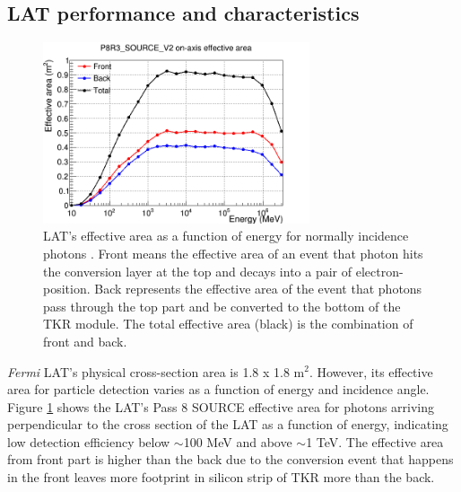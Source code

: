 \subsection{LAT performance and characteristics}

\begin{figure}[h!]
    \centering
    \includegraphics[width=0.7\textwidth]{content/background/figures/eff_energy.png}
    \caption{
        LAT's effective area as a function of energy
        for normally incidence photons \citep{lat_p8_performance}.
        Front means the effective area of an event that photon hits
        the conversion layer at the top and decays into
        a pair of electron-position.
        Back represents the effective area of the event that photons
        pass through the top part and be converted to the bottom of 
        the TKR module. The total effective area (black)
        is the combination of front and back.
    }
    \label{fig:eff_energy}
\end{figure}

\textit{Fermi} LAT's physical cross-section area is 1.8 x 1.8 m$^2$.
However, its effective area for particle detection varies as a
function of energy and incidence angle. Figure \ref{fig:eff_energy}
shows the LAT's Pass 8 SOURCE effective
area for photons arriving
perpendicular to the cross section of the LAT as a function
of energy, indicating low detection efficiency below $\sim$100 MeV
and above $\sim$1 TeV.
The effective area from front part is higher than the back due to 
the conversion event that happens in the front 
leaves more footprint in silicon strip of TKR more than the back.


